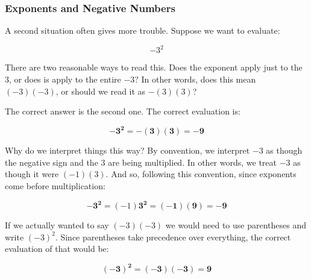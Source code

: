 
\subsubsection*{Exponents and Negative Numbers}

A second situation often gives more trouble. Suppose we want to evaluate:

$$-3^2$$

There are two reasonable ways to read this. Does the exponent apply just to the $3$, or does is apply to the entire $-3$? In other words, does this mean $(-3)(-3)$, or should we read it as $-(3)(3)$?
  
The correct answer is the second one. The correct evaluation is:

$$-\bm{3^2}=-\bm{(3)(3)}=\bm{-9}$$

Why do we interpret things this way? By convention, we interpret $-3$ as though the negative sign and the $3$ are being multiplied. In other words, we treat $-3$ as though it were $(-1)(3)$. And so, following this convention, since exponents come before multiplication:

$$-\bm{3^2}=(-1)\bm{3^2}=\bm{(-1)(9)}=\bm{-9}$$

If we actually wanted to say $(-3)(-3)$ we would need to use parentheses and write $(-3)^2$.  Since parentheses take precedence over everything, the correct evaluation of that would be:

$$\bm{(-3)^2}=\bm{(-3)(-3)}=\bm{9}$$


